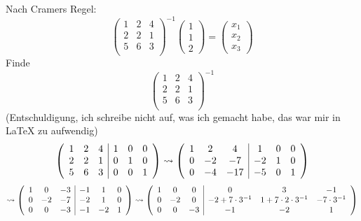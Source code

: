 \documentclass[sectionformat = aufgabe]{gadsescript}
\begin{document}
Nach Cramers Regel:
\[
	\begin{pmatrix}
		1 & 2 & 4 \\
		2 & 2 & 1 \\
		5 & 6 & 3 \\
	\end{pmatrix} ^{-1} 
	\begin{pmatrix} 1 \\ 1 \\ 2 \end{pmatrix} 
	= 
	\begin{pmatrix} x_1 \\ x_2 \\ x_3 \end{pmatrix} 
\]
Finde 
\[
	\begin{pmatrix}
		1 & 2 & 4 \\
		2 & 2 & 1 \\
		5 & 6 & 3 \\
	\end{pmatrix} ^{-1} 
\]
(Entschuldigung, ich schreibe nicht auf, was ich gemacht habe, das war mir in \LaTeX{} zu aufwendig)
\[
	\left(
		\begin{array}{c c c | c c c}
			1 & 2 & 4 & 1 & 0 & 0 \\
			2 & 2 & 1 & 0 & 1 & 0 \\
			5 & 6 & 3 & 0 & 0 & 1 \\
		\end{array}
	\right)
	\rightsquigarrow
	\left(
		\begin{array}{c c c | c c c}
			1 &  2 &  4  &  1 & 0 & 0 \\
			0 & -2 & -7  & -2 & 1 & 0 \\
			0 & -4 & -17 & -5 & 0 & 1 \\
		\end{array}
	\right)
\]
\[
	\rightsquigarrow
	\left(
		\begin{array}{c c c | c c c}
			1 &  0 & -3 & -1 &  1 & 0 \\
			0 & -2 & -7 & -2 &  1 & 0 \\
			0 &  0 & -3 & -1 & -2 & 1 \\
		\end{array}
	\right)
	\rightsquigarrow
	\left(
		\begin{array}{c c c | c c c}
			1 &  0 &  0 &  0			&  3				& -1 \\
			0 & -2 &  0 & -2 + 7 \cdot 3^{-1}	&  1 + 7 \cdot 2 \cdot 3^{-1}	& -7 \cdot 3^{-1}  \\
			0 &  0 & -3 & -1			& -2				& 1 \\
		\end{array}
	\right)
\]
\end{document}
